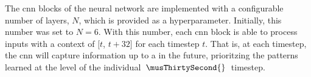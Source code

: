 
The \gls{cnn} blocks of the neural network are implemented
with a configurable number of layers, $N$, which is provided
as a hyperparameter. Initially, this number was set to
$N=6$. With this number, each \gls{cnn} block is able to
process inputs with a context of $[t$, $t + 32]$ for each
timestep $t$. That is, at each \musThirtySecond{} timestep,
the \gls{cnn} will capture information up to a \musWhole{}
in the future, prioritzing the patterns learned at the level
of the individual $\: \musThirtySecond{} \:$ timestep.

